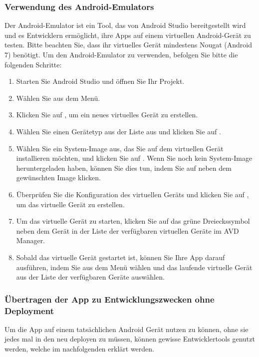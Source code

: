 \subsubsection{Verwendung des Android-Emulators}
Der Android-Emulator ist ein Tool, das von Android Studio bereitgestellt wird und es Entwicklern ermöglicht, ihre Apps auf einem virtuellen Android-Gerät zu testen. Bitte beachten Sie, dass ihr virtuelles Gerät mindestens Nougat (Android 7) benötigt. Um den Android-Emulator zu verwenden, befolgen Sie bitte die folgenden Schritte:\newline
\noindent
\begin{enumerate}
    \item Starten Sie Android Studio und öffnen Sie Ihr Projekt.
    \item Wählen Sie  aus dem  Menü.
    \item Klicken Sie auf , um ein neues virtuelles Gerät zu erstellen.
    \item Wählen Sie einen Gerätetyp aus der Liste aus und klicken Sie auf .
    \item Wählen Sie ein System-Image aus, das Sie auf dem virtuellen Gerät installieren möchten, und klicken Sie auf . Wenn Sie noch kein System-Image heruntergeladen haben, können Sie dies tun, indem Sie auf  neben dem gewünschten Image klicken.
    \item Überprüfen Sie die Konfiguration des virtuellen Geräts und klicken Sie auf , um das virtuelle Gerät zu erstellen.
    \item Um das virtuelle Gerät zu starten, klicken Sie auf das grüne Dreieckssymbol neben dem Gerät in der Liste der verfügbaren virtuellen Geräte im AVD Manager.
    \item Sobald das virtuelle Gerät gestartet ist, können Sie Ihre App darauf ausführen, indem Sie  aus dem  Menü wählen und das laufende virtuelle Gerät aus der Liste der verfügbaren Geräte auswählen.
\end{enumerate}

\subsubsection{Übertragen der App zu Entwicklungszwecken ohne Deployment}
Um die App auf einem tatsächlichen Android Gerät nutzen zu können, ohne sie jedes mal in den neu deployen zu müssen, können gewisse Entwicklertools genutzt werden, welche im nachfolgenden erklärt werden.
